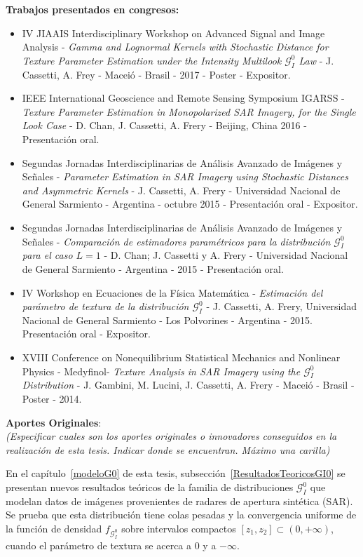 \textbf{Trabajos presentados en congresos:}
		\begin{itemize}
			\item  	IV JIAAIS Interdisciplinary Workshop on Advanced Signal and Image Analysis -  \emph{Gamma and Lognormal Kernels with Stochastic Distance for Texture Parameter Estimation under the Intensity Multilook $\mathcal{G}_I^0$ Law} - J. Cassetti, A. Frey - Maceió  - Brasil - 2017 - Poster -  Expositor.
			\item  IEEE International Geoscience and Remote Sensing Symposium IGARSS - \emph{Texture Parameter Estimation in Monopolarized SAR Imagery, for the Single Look Case} - D. Chan, J. Cassetti, A. Frery  - Beijing, China 2016 - Presentación oral.
			\item Segundas Jornadas Interdisciplinarias de Análisis Avanzado de Imágenes y Señales  - \emph{Parameter Estimation in SAR Imagery using Stochastic Distances and Asymmetric Kernels} - J. Cassetti, A. Frery - Universidad Nacional de General Sarmiento - Argentina - octubre 2015 - Presentación oral - Expositor.
			\item Segundas Jornadas Interdisciplinarias de Análisis Avanzado de Imágenes y Señales - \emph{Comparación de estimadores paramétricos para la distribución $\mathcal{G}_I^0$ para el caso $L = 1$} -  D. Chan; J. Cassetti y A. Frery - Universidad Nacional de General Sarmiento - Argentina - 2015  - Presentación oral.
			\item IV Workshop en Ecuaciones de la Física Matemática  - \emph{Estimación del parámetro de textura de la distribución $\mathcal{G}_I^0$} - J. Cassetti, A. Frery, Universidad Nacional de General Sarmiento - Los Polvorines - Argentina - 2015. Presentación oral - Expositor.
			\item XVIII Conference on Nonequilibrium Statistical Mechanics and Nonlinear Physics - Medyfinol- \emph{Texture Analysis in SAR Imagery using the $\mathcal{G}_I^0$ Distribution}  - J. Gambini,  M. Lucini, J. Cassetti, A. Frery - Maceió  - Brasil - Poster - 2014.
		\end{itemize}
\newpage

\textbf{Aportes Originales}:\\
\emph{(Especificar cuales son los aportes originales o innovadores conseguidos en la realización de esta tesis. Indicar donde se encuentran. Máximo una carilla)}

\vspace{0.5cm}
En el capítulo~\ref{modeloG0} de esta tesis, subsección~\ref{ResultadosTeoricosGI0} se presentan nuevos resultados teóricos de la familia de distribuciones $\mathcal{G}_I^0$ que modelan datos de imágenes provenientes de radares de apertura sintética (SAR). Se prueba que esta distribución tiene colas pesadas y la convergencia uniforme de la función de densidad $f_{\mathcal{G}_I^0}$ sobre intervalos compactos $[z_1,z_2]\subset(0,+\infty)$, cuando el parámetro de textura se acerca a $0$ y a $-\infty$.

